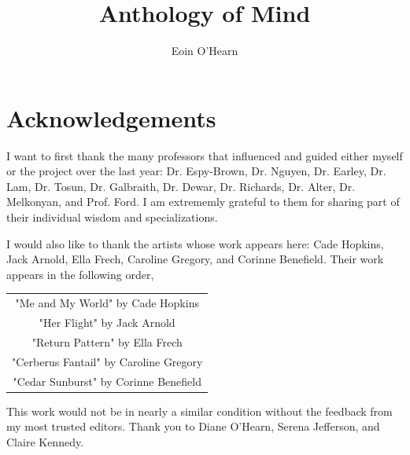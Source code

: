 \documentclass[12pt]{article}
\title{Anthology of Mind}
\author{Eoin O'Hearn}
\date{}
\begin{document}
\maketitle
\clearpage
\tableofcontents
\clearpage

\section{Acknowledgements}
I want to first thank the many professors that influenced and guided either myself or the project over the last year: Dr. Espy-Brown, Dr. Nguyen, Dr. Earley, Dr. Lam, Dr. Tosun, Dr. Galbraith, Dr. Dewar, Dr. Richards, Dr. Alter, Dr. Melkonyan, and Prof. Ford. I am extrememly grateful to them for sharing  part of their individual wisdom and specializations. 

I would also like to thank the artists whose work appears here: Cade Hopkins, Jack Arnold, Ella Frech, Caroline Gregory, and Corinne Benefield. Their work appears in the following order,

\begin{center}
    \begin{tabular}{c}
        "Me and My World" by Cade Hopkins \\
        "Her Flight" by Jack Arnold \\
        "Return Pattern" by Ella Frech \\
        "Cerberus Fantail" by Caroline Gregory \\
        "Cedar Sunburst" by Corinne Benefield \\
    \end{tabular}
\end{center}

This work would not be in nearly a similar condition without the feedback from my most trusted editors. Thank you to Diane O'Hearn, Serena Jefferson, and Claire Kennedy. 
\newpage


\newpage



\newpage


\end{document}
